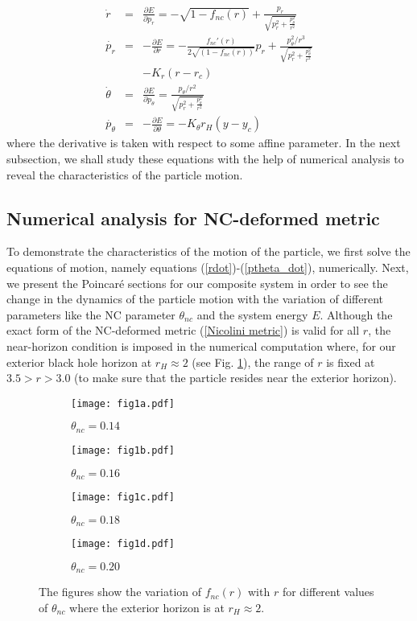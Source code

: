 \documentclass[aps,prd,showpacs,nofootinbib,floats,floatfix,preprintnumbers,groupedaddress,twocolumn]{revtex4-1}
\begin{document}
\begin{eqnarray}
\dot{r}&=&\frac{\partial E}{\partial p_{r}}=-\sqrt{1-f_{nc}(r)}+\frac{p_{r}}{\sqrt{p_{r}^{2}+\frac{p_{\theta}^{2}}{r^{2}}}}\label{rdot}\\
\dot{p_r}&=&- \frac{\partial E}{\partial r} = -\frac{f_{nc}'(r)}{2 \sqrt{(1-f_{nc}(r))}}p_r + \frac{p_\theta ^2 /r^3}{\sqrt{p_r^2 + \frac{ p_\theta ^2}{r^2}}}\nonumber\\
&&- K_r(r-r_c)\\
\dot{\theta}&=&\frac{\partial E}{\partial p_\theta} = \frac{p_\theta /r^2}{\sqrt{p_r^2 + \frac{ p_\theta ^2}{r^2}}}\\\label{theta_dot}
\dot{p_\theta}&=& - \frac{\partial E}{\partial \theta} = -K_\theta r_H(y-y_c)\label{ptheta_dot}
\end{eqnarray} 
%
%
%
where the derivative is taken with respect to some affine parameter.
In the next subsection, we shall study these equations with the help of numerical analysis to reveal the characteristics of the particle motion. 
%
%
%
\subsection{Numerical analysis for NC-deformed metric}
%
%
%
\par\noindent
To demonstrate the characteristics of the motion of the particle, we first solve the equations of motion, namely equations (\ref{rdot})-(\ref{ptheta_dot}), numerically. Next, we present the Poincar\'e sections for our composite system in order to see the change in the dynamics of the particle motion with the variation of different parameters like the NC parameter $\theta_{nc}$ and the system energy $E$.  Although the exact form of the NC-deformed metric (\ref{Nicolini metric}) is valid for all $r$, the near-horizon condition is imposed in the numerical computation where, for our exterior black hole horizon at $r_{H}\approx 2$ (see Fig. \ref{fig:1}), the range of $r$ is fixed at $3.5>r>3.0$ (to make sure that the particle resides near the exterior horizon).

\begin{figure}[H]
	\centering
	\begin{subfigure}[b]{0.49\linewidth}
		\texttt{[image: fig1a.pdf]}
		\caption{$\theta_{nc} = 0.14$}
	\end{subfigure}
	\begin{subfigure}[b]{0.49\linewidth}
		\texttt{[image: fig1b.pdf]}
		\caption{$\theta_{nc} = 0.16$}
	\end{subfigure}
	\begin{subfigure}[b]{0.49\linewidth}
		\texttt{[image: fig1c.pdf]}
		\caption{$\theta_{nc} = 0.18$}
	\end{subfigure}
	\begin{subfigure}[b]{0.49\linewidth}
		\texttt{[image: fig1d.pdf]}
		\caption{$\theta_{nc} = 0.20$}
	\end{subfigure}
	\caption{The figures show the variation of $f_{nc}(r)$ with $r$ for different values of $\theta_{nc}$ where the exterior horizon is at $r_H\approx2$.\label{fig:1}}
\end{figure}
%
%
%
%
\end{document}
